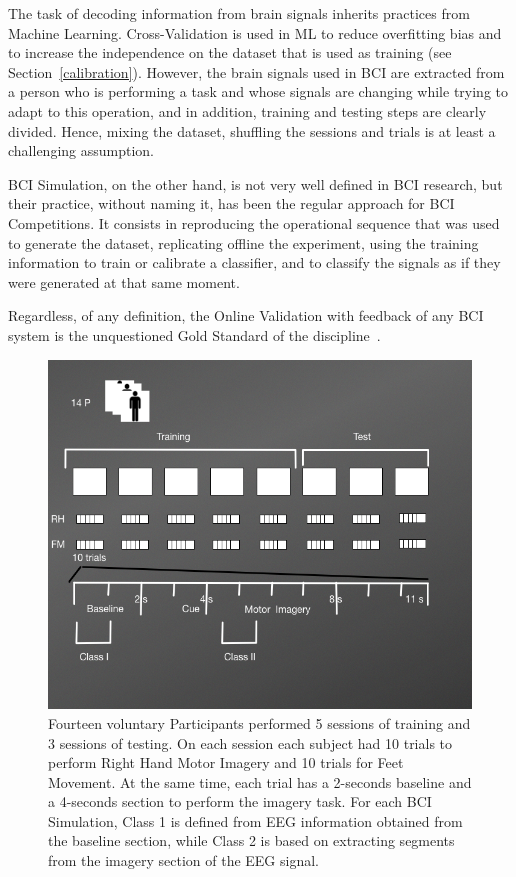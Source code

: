 \begin{story}
The task of decoding information from brain signals inherits practices from Machine Learning.  Cross-Validation is used in ML to reduce overfitting bias and to increase the independence on the dataset that is used as training (see Section~\ref{calibration}).  However, the brain signals used in BCI are extracted from a person who is performing a task and whose signals are changing while trying to adapt to this operation, and in addition, training and testing steps are clearly divided.  Hence, mixing the dataset, shuffling the sessions and trials is at least a challenging assumption.

BCI Simulation, on the other hand, is not very well defined in BCI research, but their practice, without naming it, has been the regular approach for BCI Competitions. It consists in reproducing the operational sequence that was used to generate the dataset,  replicating offline the experiment, using the training information to train or calibrate a classifier, and to classify the signals as if they were generated at that same moment.

Regardless, of any definition, the Online Validation with feedback of any BCI system is the unquestioned Gold Standard of the discipline~\cite{WolpawJonathanR2012}.
\end{story}


\begin{figure}[]
\centering
\includegraphics[scale=0.6]{images/DatasetIIIDiagram2.png}
\caption[Motor Imagery Experimental Protocol]{Fourteen voluntary Participants performed 5 sessions of training and 3 sessions of testing.  On each session each subject had 10 trials to perform Right Hand Motor Imagery and 10 trials for Feet Movement.  At the same time, each trial has a 2-seconds baseline and a 4-seconds section to perform the imagery task.  For each BCI Simulation, Class 1 is defined from EEG information obtained from the baseline section, while Class 2 is based on extracting segments from the imagery section of the EEG signal.}
\label{fig:midatasetdiagram}
\end{figure}


